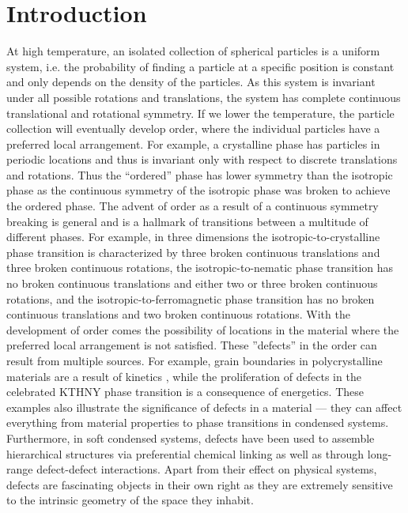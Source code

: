 \chapter{Introduction}
At high temperature, an isolated collection of spherical particles is a uniform system, i.e. the probability of finding a particle at a specific position is constant and only depends on the density of the particles.
As this system is invariant under all possible rotations and translations, the system has complete continuous translational and rotational symmetry.
If we lower the temperature, the particle collection will eventually develop order, where the individual particles have a preferred local arrangement.
For example, a crystalline phase has particles in periodic locations and thus is invariant only with respect to discrete translations and rotations.
Thus the ``ordered'' phase has lower symmetry than the isotropic phase as the continuous symmetry of the isotropic phase was broken to achieve the ordered phase.
The advent of order as a result of a continuous symmetry breaking is general and is a hallmark of transitions between a multitude of different phases. For example, in three dimensions the isotropic-to-crystalline phase transition is characterized by three broken continuous translations and three broken continuous rotations, the isotropic-to-nematic phase transition has no broken continuous translations and either two or three broken continuous rotations, and the isotropic-to-ferromagnetic phase transition has no broken continuous translations and two broken continuous rotations.
With the development of order comes the possibility of locations in the material where the preferred local arrangement is not satisfied.
These ''defects'' in the order can result from multiple sources.
For example, grain boundaries in polycrystalline materials are a result of kinetics , while the proliferation of defects in the celebrated KTHNY phase transition is a consequence of energetics.
These examples also illustrate the significance of defects in a material --- they can affect everything from material properties to phase transitions in condensed systems.
Furthermore, in soft condensed systems, defects have been used to assemble hierarchical structures via preferential chemical linking as well as through long-range defect-defect interactions.
Apart from their effect on physical systems, defects are fascinating objects in their own right as they are extremely sensitive to the intrinsic geometry of the space they inhabit.
